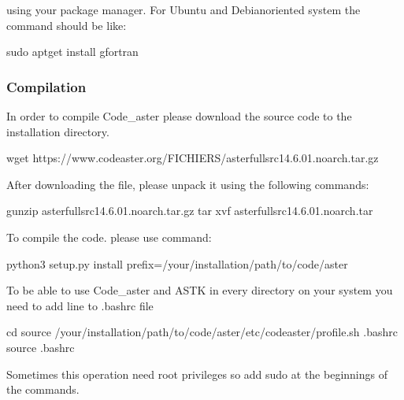 \documentclass[letterpaper,10pt,english]{sphinxmanual}
\begin{document}
using your package manager. For Ubuntu and Debian\sphinxhyphen{}oriented system the command should be like:

\begin{sphinxVerbatim}[commandchars=\\\{\}]
sudo apt\PYGZhy{}get install gfortran
\end{sphinxVerbatim}


\subsubsection{Compilation}
\label{\detokenize{software_setup/code_aster:compilation}}
In order to compile Code\_aster please download the source code to the installation directory.

\begin{sphinxVerbatim}[commandchars=\\\{\}]
wget https://www.code\PYGZhy{}aster.org/FICHIERS/aster\PYGZhy{}full\PYGZhy{}src\PYGZhy{}14.6.0\PYGZhy{}1.noarch.tar.gz
\end{sphinxVerbatim}

After downloading the file, please unpack it using the following commands:

\begin{sphinxVerbatim}[commandchars=\\\{\}]
gunzip aster\PYGZhy{}full\PYGZhy{}src\PYGZhy{}14.6.0\PYGZhy{}1.noarch.tar.gz
tar \PYGZhy{}xvf aster\PYGZhy{}full\PYGZhy{}src\PYGZhy{}14.6.0\PYGZhy{}1.noarch.tar
\end{sphinxVerbatim}

To compile the code. please use command:

\begin{sphinxVerbatim}[commandchars=\\\{\}]
python3 setup.py install \PYGZhy{}\PYGZhy{}prefix=/your/installation/path/to/code/aster
\end{sphinxVerbatim}

To be able to use Code\_aster and ASTK in every directory on your system you need to add line to .bashrc file

\begin{sphinxVerbatim}[commandchars=\\\{\}]
cd
source /your/installation/path/to/code/aster/etc/codeaster/profile.sh \PYGZgt{} .bashrc
source .bashrc
\end{sphinxVerbatim}

Sometimes this operation need root privileges so add sudo at the beginnings of the commands.
\end{document}
